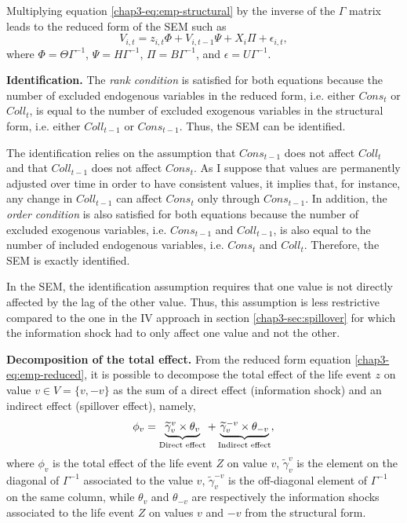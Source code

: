 Multiplying equation \eqref{chap3-eq:emp-structural} by the inverse of the $\Gamma$ matrix leads to the reduced form of the SEM such as
\begin{equation}
    V_{i,t} = z_{i,t}\Phi + V_{i,t-1}\Psi + X_{i}\Pi + \epsilon_{i,t}, \label{chap3-eq:emp-reduced}
\end{equation}
where $\Phi = \Theta\Gamma^{-1}$, $\Psi = H\Gamma^{-1}$, $\Pi = B\Gamma^{-1}$, and $\epsilon = U\Gamma^{-1}$. 

\textbf{Identification.}
The \textit{rank condition} is satisfied for both equations because the number of excluded endogenous variables in the reduced form, i.e. either $Cons_t$ or $Coll_t$, is equal to the number of excluded exogenous variables in the structural form, i.e. either $Coll_{t-1}$ or $Cons_{t-1}$. Thus, the SEM can be identified.

The identification relies on the assumption that $Cons_{t-1}$ does not affect $Coll_t$ and that $Coll_{t-1}$ does not affect $Cons_t$. As I suppose that values are permanently adjusted over time in order to have consistent values, it implies that, for instance, any change in $Coll_{t-1}$ can affect $Cons_t$ only through $Cons_{t-1}$. In addition, the \textit{order condition} is also satisfied for both equations because the number of excluded exogenous variables, i.e. $Cons_{t-1}$ and $Coll_{t-1}$, is also equal to the number of included endogenous variables, i.e. $Cons_{t}$ and $Coll_{t}$. Therefore, the SEM is exactly identified.

In the SEM, the identification assumption requires that one value is not directly affected by the lag of the other value. Thus, this assumption is less restrictive compared to the one in the IV approach in section \ref{chap3-sec:spillover} for which the information shock had to only affect one value and not the other.

\textbf{Decomposition of the total effect.}
From the reduced form equation \eqref{chap3-eq:emp-reduced}, it is possible to decompose the total effect of the life event $z$ on value $v \in V=\{v,-v\}$ as the sum of a direct effect (information shock) and an indirect effect (spillover effect), namely,
\begin{equation} \label{chap3-eq:decomp}
    \phi_v = 
    \begingroup
    \underbrace{\widetilde{\gamma}_v^v\times \theta_{v}}_\text{Direct effect}\endgroup 
    + 
    \begingroup
    \underbrace{\widetilde{\gamma}_v^{-v} \times \theta_{-v}}_\text{Indirect effect}\endgroup,
\end{equation}
where $\phi_v$ is the total effect of the life event $Z$ on value $v$, $\widetilde{\gamma}_v^v$ is the element on the diagonal of $\Gamma^{-1}$ associated to the value $v$, $\widetilde{\gamma}_v^{-v}$ is the off-diagonal element of $\Gamma^{-1}$ on the same column, while $\theta_v$ and $\theta_{-v}$ are respectively the information shocks associated to the life event $Z$ on values $v$ and $-v$ from the structural form. 

